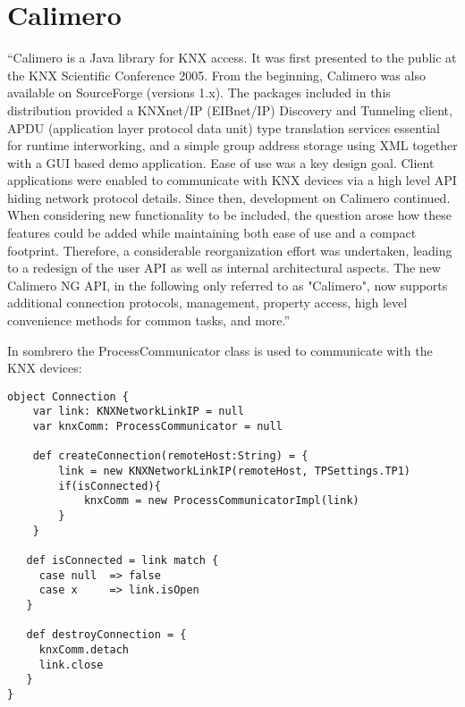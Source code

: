 \section{Calimero}
``Calimero is a Java library for KNX access. It was first presented to the public at the KNX Scientific Conference 2005.
From the beginning, Calimero was also available on SourceForge (versions 1.x). The packages included in this distribution provided a KNXnet/IP (EIBnet/IP) Discovery and Tunneling client, APDU (application layer protocol data unit) type translation services essential for runtime interworking, and a simple group address storage using XML together with a GUI based demo application. Ease of use was a key design goal. Client applications were enabled to communicate with KNX devices via a high level API hiding network protocol details. Since then, development on Calimero continued. When considering new functionality to be included, the question arose how these features could be added while maintaining both ease of use and a compact footprint. Therefore, a considerable reorganization effort was undertaken, leading to a redesign of the user API as well as internal architectural aspects. The new Calimero NG API, in the following only referred to as "Calimero", now supports additional connection protocols, management, property access, high level convenience methods for common tasks, and more.''\cite{auto.tuwien.ac.at:calimeropdf}


In sombrero the ProcessCommunicator class is used to communicate with the KNX devices:
\begin{lstlisting}[caption=Calimero ProcessCommunicator: Connection.scala,label=lst:calimero:connection]
object Connection {
  	var link: KNXNetworkLinkIP = null
	var knxComm: ProcessCommunicator = null

  	def createConnection(remoteHost:String) = {
  		link = new KNXNetworkLinkIP(remoteHost, TPSettings.TP1)
  		if(isConnected){
  			knxComm = new ProcessCommunicatorImpl(link)
  		}
  	}

   def isConnected = link match {
     case null 	=> false
     case x		=> link.isOpen
   }

   def destroyConnection = {
     knxComm.detach
     link.close
   }
}
\end{lstlisting}

